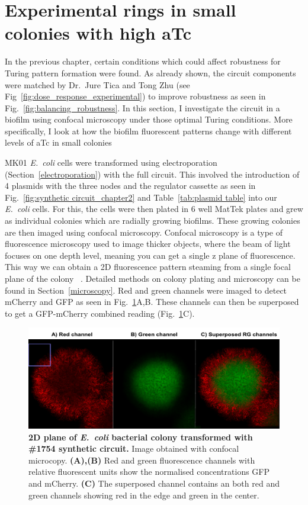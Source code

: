 \section{Experimental rings in small colonies with high aTc}\label{Rings in small colonies with high aTc}
In the previous chapter, certain conditions which could affect robustness for Turing pattern formation were found.
As already shown, the circuit components were matched by Dr.~Jure Tica and Tong Zhu (see Fig~\ref{fig:dose_response_experimental}) to improve robustness as seen in Fig.~\ref{fig:balancing_robustness}.
In this section, I investigate the circuit in a biofilm using confocal microscopy under those optimal Turing conditions.
More specifically, I look at how the biofilm fluorescent patterns change with different levels of aTc in small colonies

MK01 \textit{E.~coli} cells were transformed using electroporation (Section~\ref{electroporation}) with the full circuit.
This involved the introduction of 4 plasmids with the three nodes and the regulator cassette as seen in Fig.~\ref{fig:synthetic circuit_chapter2} and Table~\ref{tab:plasmid table} into our \textit{E.~coli} cells.
For this, the cells were then plated in 6 well MatTek plates and grew as individual colonies which are radially growing biofilms.
These growing colonies are then imaged using confocal microscopy.
Confocal microscopy is a type of fluorescence microscopy used to image thicker objects, where the beam of light focuses on one depth level, meaning you can get a single z plane of fluorescence.
This way we can obtain a 2D fluorescence pattern steaming from a single focal plane of the colony ~\parencite{semwogerere2005confocal}.
 Detailed methods on colony plating and microscopy can be found in Section~\ref{microscopy}.
Red and green channels were imaged to detect mCherry and GFP as seen in Fig.~\ref{rgchannels}A,B.
These channels can then be superposed to get a GFP-mCherry combined reading (Fig.~\ref{rgchannels}C).
\begin{figure}[H]

    \includegraphics[width=1\textwidth]{chapters/Chapter 3/rgchannels}
    \caption{\textbf{2D plane of \textit{E.~coli} bacterial colony transformed with \#1754 synthetic circuit.} Image obtained with confocal microcopy. \textbf{(A),(B)} Red and green fluorescence channels with relative fluorescent units show the normalised concentrations GFP and mCherry. \textbf{(C)} The superposed channel contains an both red and green channels showing red in the edge and green in the center.}
    \label{rgchannels}
\end{figure}

